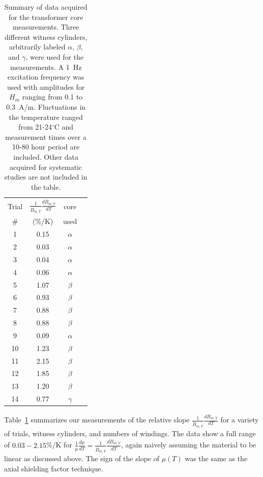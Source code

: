 \begin{table}
\begin{center}
\begin{tabular}{cccc}\hline
Trial & $\frac{1}{\dot{B}_{m,Y}}\frac{d\dot{B}_{m,Y}}{dT}$ & core \\
\#    & (\%/K) & used \\\hline
 1 & 0.15 & $\alpha$ \\
 2 & 0.03 & $\alpha$ \\
 3 & 0.04 & $\alpha$ \\
 4 & 0.06 & $\alpha$ \\
 5 & 1.07 & $\beta$  \\
 6 & 0.93 & $\beta$  \\
 7 & 0.88 & $\beta$  \\
 8 & 0.88 & $\beta$  \\
 9 & 0.09 & $\alpha$ \\
10 & 1.23 & $\beta$  \\
11 & 2.15 & $\beta$  \\
12 & 1.85 & $\beta$  \\
13 & 1.20 & $\beta$  \\
14 & 0.77 & $\gamma$ \\\hline
\end{tabular}
\caption[Summary of transformer core meaurement data]{Summary of data
  acquired for the transformer core measurements.  Three different
  witness cylinders, arbitrarily labeled $\alpha$, $\beta$, and
  $\gamma$, were used for the measurements.  A 1~Hz excitation
  frequency was used with amplitudes for $H_m$ ranging from 0.1 to
  0.3~A/m.  Fluctuations in the temperature ranged from 21-24$^\circ$C
  and measurement times over a 10-80 hour period are included.  Other
  data acquired for systematic studies are not included in the
  table.\label{tab:transformer}}
\end{center}
\end{table}



Table~\ref{tab:transformer} summarizes our measurements of the
relative slope $\frac{1}{\dot{B}_{m,Y}}\frac{d\dot{B}_{m,Y}}{dT}$ for
a variety of trials, witness cylinders, and numbers of windings.  The
data show a full range of $0.03-2.15$\%/K for
$\frac{1}{\mu}\frac{d\mu}{dT}=\frac{1}{\dot{B}_{m,Y}}\frac{d\dot{B}_{m,Y}}{dT}$,
again naively assuming the material to be linear as discussed above.
The sign of the slope of $\mu(T)$ was the same as the axial shielding
factor technique.

